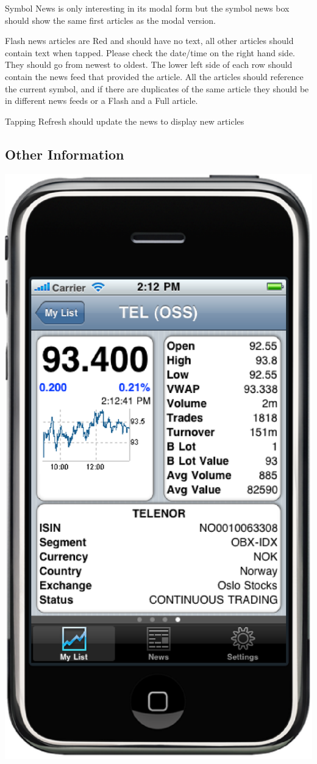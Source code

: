 \documentclass[12pt,twoside,letterpaper]{report}
\begin{document}
Symbol News is only interesting in its modal form but the symbol news box should show the same first articles as the modal version.

Flash news articles are Red and should have no text, all other articles should contain text when tapped. Please check the date/time on the right hand side. They should go from newest to oldest. The lower left side of each row should contain the news feed that provided the article. All the articles should reference the current symbol, and if there are duplicates of the same article they should be in different news feeds or a Flash and a Full article.

Tapping Refresh should update the news to display new articles

\subsection*{Other Information}
\includegraphics[scale=0.5]{symbolDetailOtherInformation}
\end{document}
